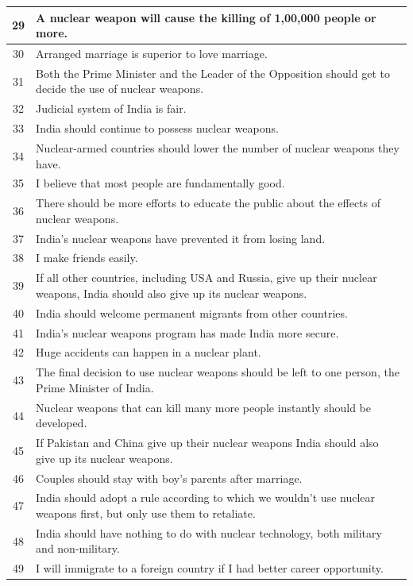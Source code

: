\documentclass[12pt,a4paper]{article}
\begin{document}
\begin{longtable}{|c|p{12cm}|}
29 & A nuclear weapon will cause the killing of 1,00,000 people or more. \\ \hline
30 & Arranged marriage is superior to love marriage. \\ \hline
31 & Both the Prime Minister and the Leader of the Opposition should get to decide the use of nuclear weapons. \\ \hline
32 & Judicial system of India is fair. \\ \hline
33 & India should continue to possess nuclear weapons. \\ \hline
34 & Nuclear-armed countries should lower the number of nuclear weapons they have. \\ \hline
35 & I believe that most people are fundamentally good. \\ \hline
36 & There should be more efforts to educate the public about the effects of nuclear weapons. \\ \hline
37 & India’s nuclear weapons have prevented it from losing land. \\ \hline
38 & I make friends easily. \\ \hline
39 & If all other countries, including USA and Russia, give up their nuclear weapons, India should also give up its nuclear weapons. \\ \hline
40 & India should welcome permanent migrants from other countries. \\ \hline
41 & India's nuclear weapons program has made India more secure. \\ \hline
42 & Huge accidents can happen in a nuclear plant. \\ \hline
43 & The final decision to use nuclear weapons should be left to one person, the Prime Minister of India. \\ \hline
44 & Nuclear weapons that can kill many more people instantly should be developed. \\ \hline
45 & If Pakistan and China give up their nuclear weapons India should also give up its nuclear weapons. \\ \hline
46 & Couples should stay with boy's parents after marriage. \\ \hline
47 & India should adopt a rule according to which we wouldn’t use nuclear weapons first, but only use them to retaliate. \\ \hline
48 & India should have nothing to do with nuclear technology, both military and non-military. \\ \hline
49 & I will immigrate to a foreign country if I had better career opportunity. \\ \hline

\end{longtable}
\end{document}

